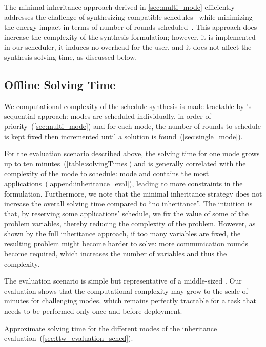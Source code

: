 The minimal inheritance approach derived in \cref{sec:multi_mode} efficiently addresses the challenge of synthesizing compatible schedules~ while minimizing the energy impact in terms of number of rounds scheduled~.
This approach does increase the complexity of the synthesis formulation; however, it is implemented in our \TTW scheduler, it induces no overhead for the user, and it does not affect the synthesis solving time, as discussed below.

\subsection{Offline Solving Time}

We computational complexity of the schedule synthesis is made tractable by \TTW's sequential approach: modes are scheduled individually, in order of priority~(\cref{sec:multi_mode}) and for each mode, the number of rounds to schedule is kept fixed then incremented until a solution is found~(\cref{sec:single_mode}).

For the evaluation scenario described above, the solving time for one mode grows up to ten minutes~(\cref{table:solvingTimes}) and is generally correlated with the complexity of the mode to schedule: mode  and  contains the most applications~(\cref{append:inheritance_eval}), leading to more constraints in the formulation.
Furthermore, we note that the minimal inheritance strategy does not increase the overall solving time compared to ``no inheritance''. The intuition is that, by reserving some applications' schedule, we fix the value of some of the problem variables, thereby reducing the complexity of the problem.
However, as shown by the full inheritance approach, if too many variables are fixed, the resulting problem might become harder to solve: more communication rounds become required, which increases the number of variables and thus the complexity.

The evaluation scenario is simple but representative of a middle-sized \CPS. Our evaluation shows that the computational complexity may grow to the scale of minutes for challenging modes, which remains perfectly tractable for a task that needs to be performed only once and before deployment.

\begin{table}
  \centering
  \caption{Approximate solving time for the different modes of the inheritance evaluation~(\cref{sec:ttw_evaluation_sched}).
  }
  \label{table:solvingTimes}
  {\smaller }
  \vspace{-5pt}
\end{table}





